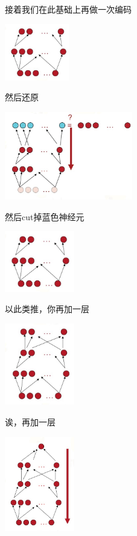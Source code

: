 \documentclass{article}
\begin{document}
接着我们在此基础上再做一次编码

\begin{center}
\includegraphics[width=1.1in]{image/image16.jpg}
\end{center}


然后还原
\begin{center}
\includegraphics[width=2.2in]{image/image17.jpg}
\end{center}
然后cut掉蓝色神经元

\begin{center}
\includegraphics[width=1.2in]{image/image18.jpg}
\end{center}

以此类推，你再加一层

\begin{center}
\includegraphics[width=1.2in]{image/image19.jpg}
\end{center}

诶，再加一层

\begin{center}
\includegraphics[width=1.2in]{image/image20.jpg}
\end{center}
\end{document}
